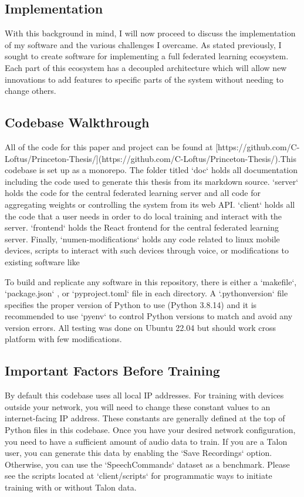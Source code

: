 \documentclass[manuscript,screen,review]{acmart}
\begin{document}
\subsection{Implementation}

With this background in mind, I will now proceed to discuss the implementation of my software and the various challenges I overcame. As stated previously, I sought to create software for implementing a full federated learning ecosystem. Each part of this ecosystem has a decoupled architecture which will allow new innovations to add features to specific parts of the system without needing to change others.

\subsection{Codebase Walkthrough}
All of the code for this paper and project can be found at [https://github.com/C-Loftus/Princeton-Thesis/](https://github.com/C-Loftus/Princeton-Thesis/).This codebase is set up as a monorepo. The folder titled `doc` holds all documentation including the code used to generate this thesis from its markdown source. `server` holds the code for the central federated learning server and all code for aggregating weights or controlling the system from its web API. `client` holds all the code that a user needs in order to do local training and interact with the server. `frontend` holds the React frontend for the central federated learning server. Finally, `numen-modifications` holds any code related to linux mobile devices, scripts to interact with such devices through voice, or modifications to existing software like 

To build and replicate any software in this repository, there is either a `makefile`, `package.json` , or `pyproject.toml` file in each directory. A `.pythonversion` file specifies the proper version of Python to use (Python 3.8.14) and it is recommended to use `pyenv` to control Python versions to match and avoid any version errors. All testing was done on Ubuntu 22.04 but should work cross platform with few modifications.

\subsection{Important Factors Before Training}

By default this codebase uses all local IP addresses. For training with devices outside your network, you will need to change these constant values to an internet-facing IP address. These constants are generally defined at the top of Python files in this codebase. Once you have your desired network configuration, you need to have a sufficient amount of audio data to train. If you are a Talon user, you can generate this data by enabling the `Save Recordings` option. Otherwise, you can use the `SpeechCommands` dataset as a benchmark. Please see the scripts located at `client/scripts` for programmatic ways to initiate training with or without Talon data.
\end{document}
